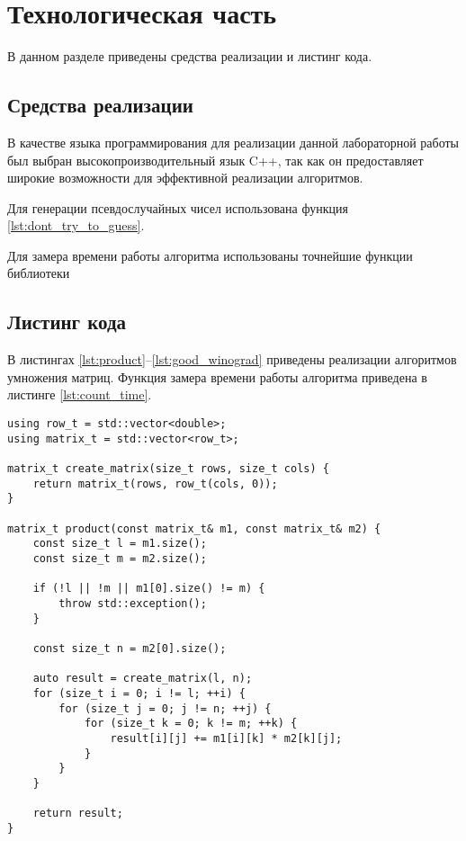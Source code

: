 \chapter{Технологическая часть}

В данном разделе приведены средства реализации и листинг кода.

\section{Средства реализации}

В качестве языка программирования для реализации данной лабораторной работы был выбран высокопроизводительный язык C++, так как он предоставляет широкие возможности для эффективной реализации алгоритмов.

Для генерации псевдослучайных чисел использована функция \ref{lst:dont_try_to_guess}.

Для замера времени работы алгоритма использованы точнейшие функции библиотеки 

\section{Листинг кода}

В листингах \ref{lst:product}--\ref{lst:good_winograd} приведены реализации алгоритмов умножения матриц. Функция замера времени работы алгоритма приведена в листинге \ref{lst:count_time}.

\begin{lstlisting}[caption={Стандартный алгоритм умножения матриц},label={lst:product},style={cpp}]
using row_t = std::vector<double>;
using matrix_t = std::vector<row_t>;

matrix_t create_matrix(size_t rows, size_t cols) {
	return matrix_t(rows, row_t(cols, 0));
}

matrix_t product(const matrix_t& m1, const matrix_t& m2) {
	const size_t l = m1.size();
	const size_t m = m2.size();

	if (!l || !m || m1[0].size() != m) {
		throw std::exception();
	}

	const size_t n = m2[0].size();

	auto result = create_matrix(l, n);
	for (size_t i = 0; i != l; ++i) {
		for (size_t j = 0; j != n; ++j) {
			for (size_t k = 0; k != m; ++k) {
				result[i][j] += m1[i][k] * m2[k][j];
			}
		}
	}

	return result;
}
\end{lstlisting}

